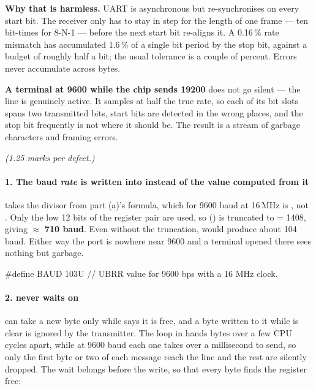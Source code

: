 \textbf{Why that is harmless.} UART is asynchronous but re-synchronises on every start bit. The
receiver only has to stay in step for the length of one frame --- ten bit-times for 8-N-1 --- before
the next start bit re-aligns it. A 0.16\,\% rate mismatch has accumulated 1.6\,\% of a single bit
period by the stop bit, against a budget of roughly half a bit; the usual tolerance is a couple of
percent. Errors never accumulate across bytes. 

\textbf{A terminal at 9600 while the chip sends 19200} does not go silent --- the line is genuinely
active. It samples at half the true rate, so each of its bit slots spans two transmitted bits, start
bits are detected in the wrong places, and the stop bit frequently is not where it should be. The
result is a stream of garbage characters and framing errors. 

\textit{(1.25 marks per defect.)}

\paragraph{1. The baud \emph{rate} is written into  instead of the value computed from
it}
 takes the divisor from part (a)'s formula, which for 9600 baud at 16\,MHz is
, not . Only the low 12 bits of the register pair are used, so 
() is truncated to  = 1408, giving 
$\approx$ \textbf{710 baud}. Even without the truncation,  would produce about
104 baud. Either way the port is nowhere near 9600 and a terminal opened there sees nothing but
garbage.

\begin{ccode}
#define BAUD 103U // UBRR value for 9600 bps with a 16 MHz clock.
\end{ccode}

\paragraph{2.  never waits on }
 can take a new byte only while  says it is free, and a byte written to it
while  is clear is ignored by the transmitter. The loop in  hands
bytes over a few CPU cycles apart, while at 9600 baud each one takes over a millisecond to send, so
only the first byte or two of each message reach the line and the rest are silently dropped. The
wait belongs before the write, so that every byte finds the register free:

